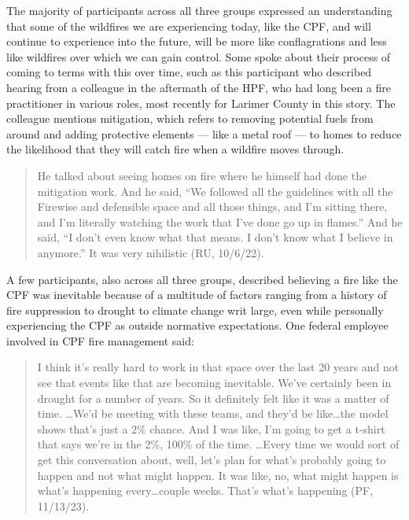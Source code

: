 \documentclass[
]{article}
\begin{document}
The majority of participants across all three groups expressed an understanding that some of the wildfires we are experiencing today, like the CPF, and will continue to experience into the future, will be more like conflagrations and less like wildfires over which we can gain control. Some spoke about their process of coming to terms with this over time, such as this participant who described hearing from a colleague in the aftermath of the HPF, who had long been a fire practitioner in various roles, most recently for Larimer County in this story. The colleague mentions mitigation, which refers to removing potential fuels from around and adding protective elements --- like a metal roof --- to homes to reduce the likelihood that they will catch fire when a wildfire moves through.

\begin{quote}
He talked about seeing homes on fire where he himself had done the mitigation work. And he said, ``We followed all the guidelines with all the Firewise and defensible space and all those things, and I'm sitting there, and I'm literally watching the work that I've done go up in flames.'' And he said, ``I don't even know what that means. I don't know what I believe in anymore.'' It was very nihilistic (RU, 10/6/22).
\end{quote}

A few participants, also across all three groups, described believing a fire like the CPF was inevitable because of a multitude of factors ranging from a history of fire suppression to drought to climate change writ large, even while personally experiencing the CPF as outside normative expectations. One federal employee involved in CPF fire management said:

\begin{quote}
I think it's really hard to work in that space over the last 20 years and not see that events like that are becoming inevitable. We've certainly been in drought for a number of years. So it definitely felt like it was a matter of time.
\ldots We'd be meeting with these teams, and they'd be like\ldots the model shows that's just a 2\% chance. And I was like, I'm going to get a t-shirt that says we're in the 2\%, 100\% of the time. \ldots Every time we would sort of get this conversation about, well, let's plan for what's probably going to happen and not what might happen. It was like, no, what might happen is what's happening every\ldots couple weeks. That's what's happening (PF, 11/13/23).
\end{quote}
\end{document}
